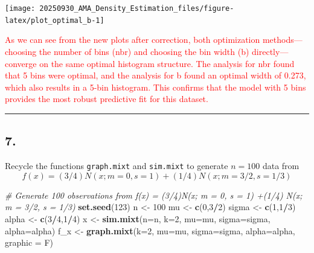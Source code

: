 \documentclass[
]{article}
\newenvironment{Shaded}{\begin{snugshade}}{\end{snugshade}}
\newcommand{\AttributeTok}[1]{\textcolor[rgb]{0.13,0.29,0.53}{#1}}
\newcommand{\CommentTok}[1]{\textcolor[rgb]{0.56,0.35,0.01}{\textit{#1}}}
\newcommand{\DecValTok}[1]{\textcolor[rgb]{0.00,0.00,0.81}{#1}}
\newcommand{\FunctionTok}[1]{\textcolor[rgb]{0.13,0.29,0.53}{\textbf{#1}}}
\newcommand{\NormalTok}[1]{#1}
\newcommand{\OtherTok}[1]{\textcolor[rgb]{0.56,0.35,0.01}{#1}}
\newcommand{\SpecialCharTok}[1]{\textcolor[rgb]{0.81,0.36,0.00}{\textbf{#1}}}
\begin{document}
\begin{center}\texttt{[image: 20250930\_AMA\_Density\_Estimation\_files/figure-latex/plot\_optimal\_b-1]} \end{center}

\textcolor{red}{As we can see from the new plots after correction, both optimization methods—choosing the number of bins (nbr) and choosing the bin width (b) directly—converge on the same optimal histogram structure. The analysis for nbr found that 5 bins were optimal, and the analysis for b found an optimal width of 0.273, which also results in a 5-bin histogram. This confirms that the model with 5 bins provides the most robust predictive fit for this dataset.}

\begin{center}\rule{0.5\linewidth}{0.5pt}\end{center}

\subsection{7.}\label{section-6}

Recycle the functions \texttt{graph.mixt} and \texttt{sim.mixt} to
generate \(n=100\) data from
\[ f(x) = (3/4)N(x; m = 0, s = 1) +(1/4) N(x; m = 3/2, s = 1/3) \]

\begin{Shaded}
\begin{Highlighting}[]
\CommentTok{\# Generate 100 observations from f(x) = (3/4)N(x; m = 0, s = 1) +(1/4) N(x; m = 3/2, s = 1/3)}
\FunctionTok{set.seed}\NormalTok{(}\DecValTok{123}\NormalTok{)}
\NormalTok{n }\OtherTok{\textless{}{-}} \DecValTok{100}
\NormalTok{mu }\OtherTok{\textless{}{-}} \FunctionTok{c}\NormalTok{(}\DecValTok{0}\NormalTok{,}\DecValTok{3}\SpecialCharTok{/}\DecValTok{2}\NormalTok{)}
\NormalTok{sigma }\OtherTok{\textless{}{-}} \FunctionTok{c}\NormalTok{(}\DecValTok{1}\NormalTok{,}\DecValTok{1}\SpecialCharTok{/}\DecValTok{3}\NormalTok{)}
\NormalTok{alpha }\OtherTok{\textless{}{-}} \FunctionTok{c}\NormalTok{(}\DecValTok{3}\SpecialCharTok{/}\DecValTok{4}\NormalTok{,}\DecValTok{1}\SpecialCharTok{/}\DecValTok{4}\NormalTok{)}
\NormalTok{x }\OtherTok{\textless{}{-}} \FunctionTok{sim.mixt}\NormalTok{(}\AttributeTok{n=}\NormalTok{n, }\AttributeTok{k=}\DecValTok{2}\NormalTok{, }\AttributeTok{mu=}\NormalTok{mu, }\AttributeTok{sigma=}\NormalTok{sigma, }\AttributeTok{alpha=}\NormalTok{alpha)}
\NormalTok{f\_x }\OtherTok{\textless{}{-}} \FunctionTok{graph.mixt}\NormalTok{(}\AttributeTok{k=}\DecValTok{2}\NormalTok{, }\AttributeTok{mu=}\NormalTok{mu, }\AttributeTok{sigma=}\NormalTok{sigma, }\AttributeTok{alpha=}\NormalTok{alpha, }\AttributeTok{graphic =}\NormalTok{ F)}
\end{Highlighting}
\end{Shaded}
\end{document}
